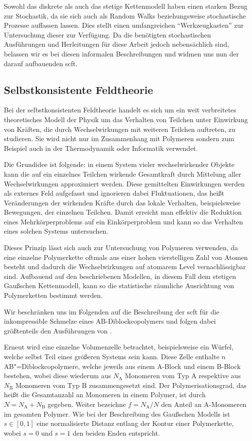\documentclass[../main.tex]{subfiles}
\begin{document}
Sowohl das diskrete als auch das stetige Kettenmodell haben einen starken Bezug zur Stochastik, da sie sich auch als Random Walks beziehungsweise stochastische Prozesse auffassen lassen.
Dies stellt einen umfangreichen \enquote{Werkzeugkasten} zur Untersuchung dieser zur Verfügung.
Da die benötigten stochastischen Ausführungen und Herleitungen für diese Arbeit jedoch nebensächlich sind, belassen wir es bei diesen informalen Beschreibungen und widmen uns nun der darauf aufbauenden \ac{scft}.


\subsection*{Selbstkonsistente Feldtheorie} %

Bei der selbstkonsistenten Feldtheorie handelt es sich um ein weit verbreitetes theoretisches Modell der Physik um das Verhalten von Teilchen unter Einwirkung von Kräften, die durch Wechselwirkungen mit weiteren Teilchen auftreten, zu studieren.
Sie wird nicht nur im Zusammenhang mit Polymeren sondern zum Beispiel auch in der Thermodynamik oder Informatik verwendet.

Die Grundidee ist folgende: in einem System vieler wechselwirkender Objekte kann die auf ein einzelnes Teilchen wirkende Gesamtkraft durch Mittelung aller Wechselwirkungen approximiert werden.
Diese gemittelten Einwirkungen werden als externes Feld aufgefasst und ignorieren dabei Fluktuationen, das heißt Veränderungen der wirkenden Kräfte durch das lokale Verhalten, beispielsweise Bewegungen, der einzelnen Teilchen.
Damit erreicht man effektiv die Reduktion eines Mehrkörperproblems auf ein Einkörperproblem und kann so das Verhalten eines solchen Systems untersuchen.

Dieses Prinzip lässt sich auch zur Untersuchung von Polymeren verwenden, da eine einzelne Polymerkette oftmals aus einer hohen vierstelligen Zahl von Atomen besteht und dadurch die Wechselwirkungen auf atomarem Level vernachlässigbar sind.
Aufbauend auf den beschriebenen Modellen, in diesem Fall dem stetigen Gaußschen Kettenmodell, kann so die statistische räumliche Ausrichtung von Polymerketten bestimmt werden.

Wir beschränken uns im Folgenden auf die Beschreibung der \ac{scft} für die inkompressible Schmelze eines AB-Diblockcopolymers und folgen dabei größtenteils den Ausführungen von \textcite{Matsen:1994bz,Stasiak:2011ba}.

Erneut wird eine einzelne Volumenzelle betrachtet, beispielsweise ein Würfel, welche selbst Teil eines größeren Systems sein kann.
Diese Zelle enthalte $n$ AB"=Diblockcopolymere, welche jeweils aus einem A-Block und einem B-Block bestehen, wobei diese wiederum aus $N_{\mathrm{A}}$ Monomeren vom Typ A respektive aus $N_{\mathrm{B}}$ Monomeren vom Typ B zusammengesetzt sind.
Der Polymerisationsgrad, das heißt die Gesamtanzahl an Monomeren in einem Polymer, ist durch $N = N_{\mathrm{A}} + N_{\mathrm{B}}$ gegeben.
Weiter bezeichne $f = N_{\mathrm{A}} / N$ den Anteil an A-Monomeren im gesamten Polymer.
Wie bei der Beschreibung des Gaußschen Modells ist $s \in [0, 1]$ eine normalisierte Distanz entlang der Kontur einer Polymerkette, wobei $s = 0$ und $s = 1$ den beiden Enden entspricht.
\end{document}
